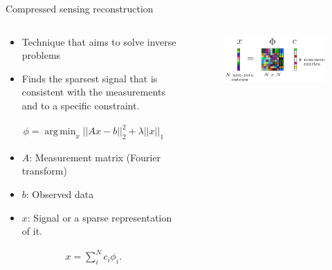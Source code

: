 \documentclass[xetex,aspectratio=169]{beamer}
\DeclareMathOperator*{\argmin}{arg\,min}
\begin{document}
    \begin{frame}{Compressed sensing reconstruction}
        \scriptsize
        \begin{columns}[onlytextwidth,t]
        \begin{column}{.5\textwidth}
            \begin{itemize}
                \item Technique that aims to solve inverse problems
                \item Finds the sparsest signal that is consistent with the measurements and to a specific constraint.
            \end{itemize}
            
			\begin{align*}
				\phi = \argmin_x ||Ax-b||_2^2 + \lambda ||x||_1
			\end{align*}
			
			\begin{itemize}
			    \item $A$: Measurement matrix (Fourier transform)
			    \item $b$: Observed data
			    \item $x$: Signal or a sparse representation of it.
			\end{itemize}

			\begin{align*}
				x=\sum_i^N c_i\phi_i.
			\end{align*}
        \end{column}
        
        \begin{column}{.5\textwidth}
            \vspace{1.5cm}
            \begin{figure}
                \centering
                \includegraphics[width=\textwidth]{figures/compressed_sensing.png}
            \end{figure}
        \end{column}
            
        \end{columns}
    \end{frame}
    
\end{document}
